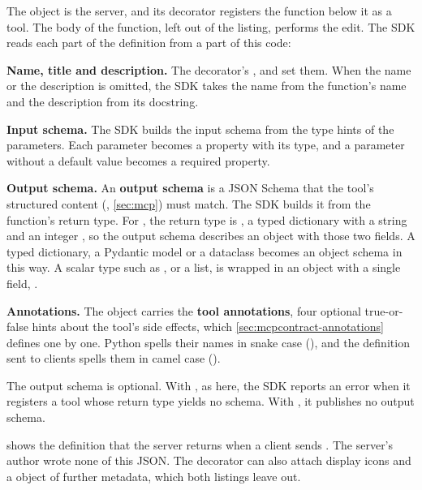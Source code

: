 The object  is the server, and its  decorator registers the function
below it as a tool. The body of the function, left out of the listing, performs the edit. The SDK reads each part of the definition from a part of this code:
\bi
\item \textbf{Name, title and description.} The decorator's ,  and
 set them. When the name or the description is omitted, the SDK takes the name
from the function's name and the description from its docstring.
\item \textbf{Input schema.} The SDK builds the input schema from the type hints of the parameters.
Each parameter becomes a property with its type, and a parameter without a default value becomes a
required property.
\item \textbf{Output schema.} An \textbf{output schema} is a JSON Schema that the tool's structured
content (, \cref{sec:mcp}) must match. The SDK builds it from the
function's return type. For , the return type is , a typed
dictionary with a string  and an integer , so the output schema
describes an object with those two fields. A typed dictionary, a Pydantic model or a dataclass
becomes an object schema in this way. A scalar type such as , or a list, is wrapped in
an object with a single field, .
\item \textbf{Annotations.} The  object carries the \textbf{tool
annotations}, four optional true-or-false hints about the tool's side effects, which
\cref{sec:mcpcontract-annotations} defines one by one. Python spells their names in snake case
(), and the definition sent to clients spells them in camel case
().
\ei

The output schema is optional. With , as here, the SDK reports an
error when it registers a tool whose return type yields no schema. With
, it publishes no output schema.

 shows the definition that the server returns when a client sends
. The server's author wrote none of this JSON. The decorator can also attach
display icons and a  object of further metadata, which both listings leave out.

